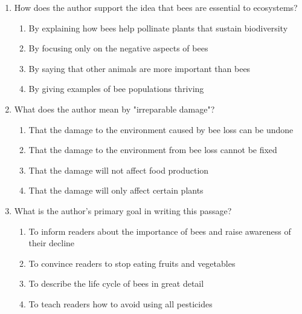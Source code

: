 \documentclass[12pt]{article}
\begin{document}
\begin{enumerate}
    \vspace{0.5cm}

    \item How does the author support the idea that bees are essential to ecosystems?
    \begin{enumerate}[label=\Alph*.]
        \item By explaining how bees help pollinate plants that sustain biodiversity
        \item By focusing only on the negative aspects of bees
        \item By saying that other animals are more important than bees
        \item By giving examples of bee populations thriving
    \end{enumerate}

    \vspace{0.5cm}

    \item What does the author mean by "irreparable damage"?
    \begin{enumerate}[label=\Alph*.]
        \item That the damage to the environment caused by bee loss can be undone
        \item That the damage to the environment from bee loss cannot be fixed
        \item That the damage will not affect food production
        \item That the damage will only affect certain plants
    \end{enumerate}

    \vspace{0.5cm}

    \item What is the author's primary goal in writing this passage?
    \begin{enumerate}[label=\Alph*.]
        \item To inform readers about the importance of bees and raise awareness of their decline
        \item To convince readers to stop eating fruits and vegetables
        \item To describe the life cycle of bees in great detail
        \item To teach readers how to avoid using all pesticides
    \end{enumerate}

    \vspace{0.5cm}


\end{enumerate}
\end{document}
